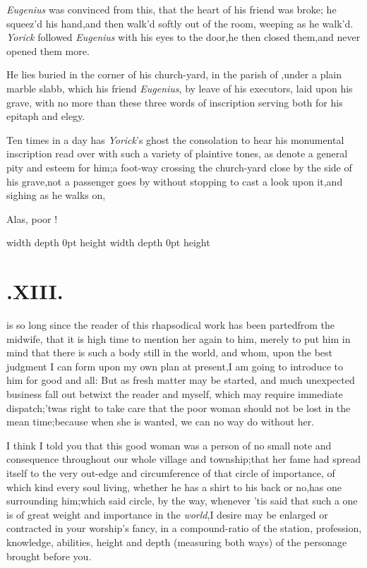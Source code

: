 \documentclass{article}
\begin{document}
\textit{Eugenius} was convinced from this,\break
that the heart of his friend was broke;\break
he squeez’d his hand,\tsh  and then\break
walk’d softly out of the room, weeping as he walk’d. \textit{Yorick}
followed \textit{Eugenius} with his eyes to the door,\tsk  he then
closed them,\tsk and never opened them more.

He lies buried in the corner of his church-yard, in the parish of
\tsh,\break under a plain marble slabb, which his friend
\textit{Eugenius}, by leave of his executors, laid upon his grave, with no more
than these three words of inscription serving both for his epitaph and
elegy.

\vfill
\centerline{}
\vfill

Ten times in a day has \textit{Yorick}’s ghost the consolation to hear his
monumental inscription read over with such a variety of plaintive tones, as
denote a general
pity and esteem for him;\tsh  a foot-way crossing the
church-yard close by the side of his grave,\tsk  not a passenger goes by
without stopping to cast a look upon it,\tsh  and sighing as he walks on,

\bigskip
\bigskip
\centerline{Alas, poor !}
\vfill
{}
\newpage \noindent \vrule width \hsize depth 0pt height \vsize
\newpage \noindent \vrule width \hsize depth 0pt height \vsize
\newpage

\section{.\enspace XIII.}

 is so long since the reader of
this rhapsodical work has been parted\break from the midwife, that it is
high time to mention her again to him, merely to put him in mind
that there is such a body still in the world, and whom, upon the
best judgment I can form upon my own plan at present,\tsk I am going to
introduce to him for good and all: But as fresh matter may be
started, and much unexpected business fall out betwixt the reader
and myself, which may require immediate
dispatch;\tsh  ’twas right to take care that the poor
woman should not be lost in the mean time;\tsk  because when she
is wanted, we can no way do without her.

I think I told you that this good wo\-man was a person of no small
note and consequence throughout our whole village and
township;\tsk  that her fame had spread itself to the very
out-edge and circumference of that circle of importance, of which
kind every soul living, whether he has a shirt to his back or no,\tsh  has
one surrounding him;\tsk  which said circle, by the way, whenever
’tis said that such a one is of great weight and importance
in the \textit{world},\tsh  I desire may be enlarged or
contracted in your worship’s fancy, in a compound-ratio of
the station, profession, knowledge, abilities, height and depth
(measuring both ways) of the personage brought before you.
\end{document}
